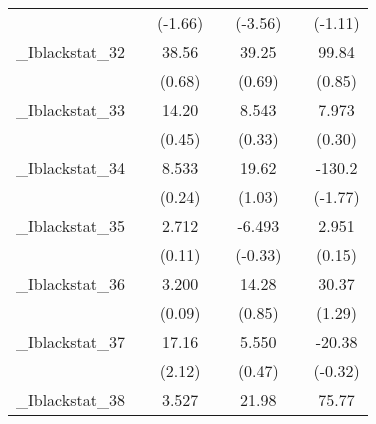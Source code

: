 {\begin{tabular}{l*{6}{c}}
            &                     &     (-1.66)         &                     &     (-3.56)         &                     &     (-1.11)         \\
[1em]
\_Iblackstat\_32&                     &       38.56         &                     &       39.25         &                     &       99.84         \\
            &                     &      (0.68)         &                     &      (0.69)         &                     &      (0.85)         \\
[1em]
\_Iblackstat\_33&                     &       14.20         &                     &       8.543         &                     &       7.973         \\
            &                     &      (0.45)         &                     &      (0.33)         &                     &      (0.30)         \\
[1em]
\_Iblackstat\_34&                     &       8.533         &                     &       19.62         &                     &      -130.2         \\
            &                     &      (0.24)         &                     &      (1.03)         &                     &     (-1.77)         \\
[1em]
\_Iblackstat\_35&                     &       2.712         &                     &      -6.493         &                     &       2.951         \\
            &                     &      (0.11)         &                     &     (-0.33)         &                     &      (0.15)         \\
[1em]
\_Iblackstat\_36&                     &       3.200         &                     &       14.28         &                     &       30.37         \\
            &                     &      (0.09)         &                     &      (0.85)         &                     &      (1.29)         \\
[1em]
\_Iblackstat\_37&                     &       17.16\sym{*}  &                     &       5.550         &                     &      -20.38         \\
            &                     &      (2.12)         &                     &      (0.47)         &                     &     (-0.32)         \\
[1em]
\_Iblackstat\_38&                     &       3.527         &                     &       21.98         &                     &       75.77         \\

\end{tabular}}
